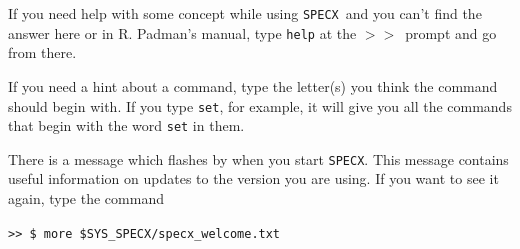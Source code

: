 \documentclass[11pt,twoside]{article}
\newcommand{\SPECX}{{\tt SPECX}}
\newcommand{\SP}{{$>\!>$}}
\begin{document}
If you need help with some concept while using \SPECX\ and you can't
find the answer here or in R. Padman's manual, type {\tt help} at the
\SP\ prompt and go from there.

If you need a hint about a command, type the letter(s) you think the
command should begin with.  If you type {\tt set}, for example, it
will give you all the commands that begin with the word {\tt set} in
them.

There is a message which flashes by when you start \SPECX . This message 
contains useful information on updates to the version you are using.
If you want to see it again, type the command

\verb|>> $ more $SYS_SPECX/specx_welcome.txt|

\typeout{  }
\typeout{*****************************************************}
\typeout{  }
\typeout{  }
\typeout{*****************************************************}
\typeout{  }
\end{document}
